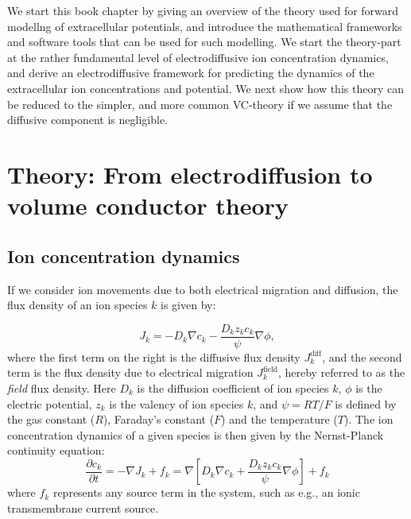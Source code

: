 \documentclass[preprint,11pt,authoryear]{elsarticle}
\begin{document}
We start this book chapter by giving an overview of the theory used for forward modellng of extracellular potentials, and introduce the mathematical frameworks and software tools that can be used for such modelling. We start the theory-part at the rather fundamental level of electrodiffusive ion concentration dynamics, and derive an electrodiffusive framework for predicting the dynamics of the extracellular ion concentrations and potential. We next show how this theory can be reduced to the simpler, and more common VC-theory if we assume that the diffusive component is negligible. 



\section{Theory: From electrodiffusion to volume conductor theory}
\label{sec:theory}

\subsection{Ion concentration dynamics}
\label{sec:eldiff}
If we consider ion movements due to both electrical migration and diffusion, the flux density of an ion species $k$ is given by:

\begin{equation}
J_{k} = -D_{k}\nabla c_{k} - \frac{D_k z_k c_k}{\psi} \nabla \phi,
\label{eq:JNP}
\end{equation}
where the first term on the right is the diffusive flux density $J_{k}^\text{diff}$, and the second term is the flux density due to electrical migration $J_{k}^\text{field}$, hereby referred to as the \emph{field} flux density.  Here $D_{k}$ is the diffusion coefficient of ion species $k$, $\phi$ is the electric potential, $z_{k}$ is the valency of ion species $k$, and $\psi=RT/F$ is defined by the gas constant ($R$), Faraday's constant ($F$)  and the temperature ($T$). The ion concentration dynamics of a given species is then given by the Nernst-Planck continuity equation: 
\begin{equation}
\frac{\partial c_k}{\partial t} = - \nabla J_k + f_k = \nabla \left[ D_k \nabla c_k + \frac{D_k z_k c_k}{\psi} \nabla \phi \right] + f_k
\label{eq:NP}
\end{equation}
where $f_k$ represents any source term in the system, such as e.g., an ionic transmembrane current source. 
\end{document}
